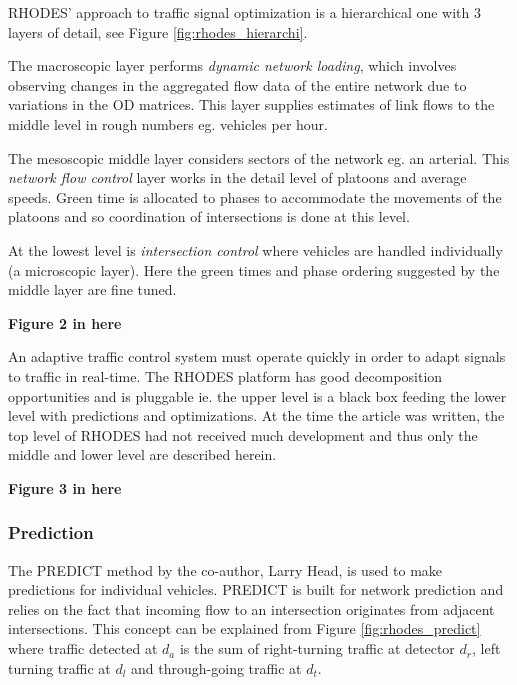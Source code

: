 \label{sec:rhodes}

RHODES' approach to traffic signal optimization is a hierarchical one
with 3 layers of detail, see Figure \ref{fig:rhodes_hierarchi}.

The macroscopic layer performs \textit{dynamic network loading}, which
involves observing changes in the aggregated flow data of the entire
network due to variations in the OD matrices. This layer supplies
estimates of link flows to the middle level in rough numbers
eg. vehicles per hour.

The mesoscopic middle layer considers sectors of the network eg. an
arterial. This \textit{network flow control} layer works in the detail
level of platoons and average speeds. Green time is allocated to
phases to accommodate the movements of the platoons and so
coordination of intersections is done at this level.

At the lowest level is \textit{intersection control} where vehicles
are handled individually (a microscopic layer). Here the green times
and phase ordering suggested by the middle layer are fine tuned.

\begin{center}
{\bf Figure 2 in here}
\end{center}

An adaptive traffic control system must operate quickly in order to
adapt signals to traffic in real-time. The RHODES platform has good
decomposition opportunities and is pluggable ie. the upper level is a
black box feeding the lower level with predictions and
optimizations. At the time the article was written, the top level of
RHODES had not received much development and thus only the middle and
lower level are described herein.

\begin{center}
{\bf Figure 3 in here}
\end{center}

\subsubsection*{Prediction}

The PREDICT method \citet{PREDICT} by the co-author, Larry Head, is
used to make predictions for individual vehicles. PREDICT is built for
network prediction and relies on the fact that incoming flow to an
intersection originates from adjacent intersections. This concept can
be explained from Figure \ref{fig:rhodes_predict} where traffic
detected at $d_a$ is the sum of right-turning traffic at detector
$d_r$, left turning traffic at $d_l$ and through-going traffic at
$d_t$.

